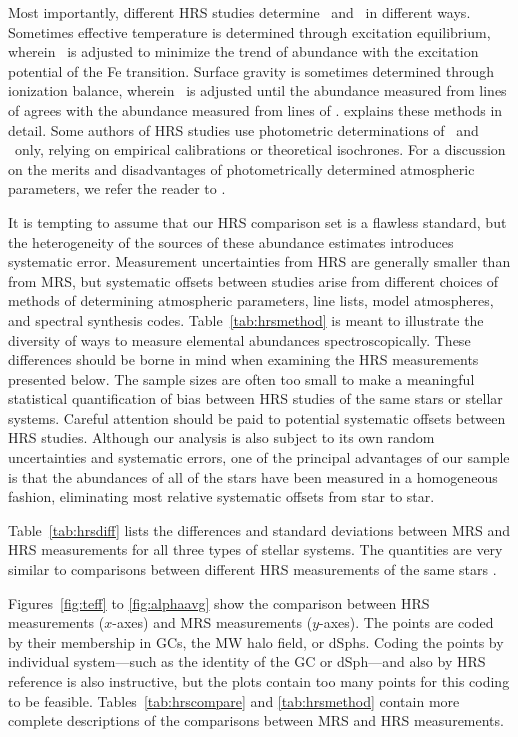 \documentclass{emulateapj}
\begin{document}
Most importantly, different HRS studies determine \teff\ and \logg\ in
different ways.  Sometimes effective temperature is determined through
excitation equilibrium, wherein \teff\ is adjusted to minimize the
trend of abundance with the excitation potential of the Fe transition.
Surface gravity is sometimes determined through ionization balance,
wherein \logg\ is adjusted until the abundance measured from lines of
 agrees with the abundance measured from lines of
.  \citet{gra08} explains these methods in detail.  Some
authors of HRS studies use photometric determinations of \teff\ and
\logg\ only, relying on empirical calibrations or theoretical
isochrones.  For a discussion on the merits and disadvantages of
photometrically determined atmospheric parameters, we refer the reader
to \citet{iva01}.

It is tempting to assume that our HRS comparison set is a flawless
standard, but the heterogeneity of the sources of these abundance
estimates introduces systematic error.  Measurement uncertainties from
HRS are generally smaller than from MRS, but systematic offsets
between studies arise from different choices of methods of determining
atmospheric parameters, line lists, model atmospheres, and spectral
synthesis codes.  Table~\ref{tab:hrsmethod} is meant to illustrate the
diversity of ways to measure elemental abundances spectroscopically.
These differences should be borne in mind when examining the HRS
measurements presented below.  The sample sizes are often too small to
make a meaningful statistical quantification of bias between HRS
studies of the same stars or stellar systems.  Careful attention
should be paid to potential systematic offsets between HRS studies.
Although our analysis is also subject to its own random uncertainties
and systematic errors, one of the principal advantages of our sample
is that the abundances of all of the stars have been measured in a
homogeneous fashion, eliminating most relative systematic offsets from
star to star.

Table~\ref{tab:hrsdiff} lists the differences and standard deviations
between MRS and HRS measurements for all three types of stellar
systems.  The quantities are very similar to comparisons between
different HRS measurements of the same stars \citep[e.g.,][their
  Appendix~B]{coh08}.

Figures~\ref{fig:teff} to \ref{fig:alphaavg} show the comparison
between HRS measurements ($x$-axes) and MRS measurements ($y$-axes).
The points are coded by their membership in GCs, the MW halo field, or
dSphs.  Coding the points by individual system---such as the identity
of the GC or dSph---and also by HRS reference is also instructive, but
the plots contain too many points for this coding to be feasible.
Tables~\ref{tab:hrscompare} and \ref{tab:hrsmethod} contain more
complete descriptions of the comparisons between MRS and HRS
measurements.
\end{document}
